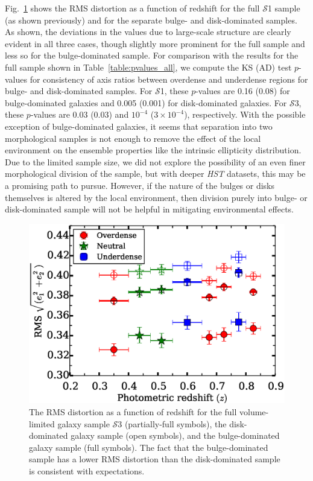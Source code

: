 \documentclass[twocolumn,useAMS,usenatbib]{mn2e}
\newcommand{\s}{\ensuremath{\mathcal{S}}}
\begin{document}
Fig.~\ref{fig:rmsellip_bulge_disk} shows the RMS distortion as
  a function of redshift for the full \s1 sample (as shown previously) and
  for the separate bulge- and disk-dominated samples.  As shown,
  the deviations in the values due to large-scale structure are
  clearly evident in all three cases, though slightly more prominent
  for the full sample and less so for the bulge-dominated sample.  For
comparison with the results for the full sample shown in
Table~\ref{table:pvalues_all}, we compute the KS (AD) test $p$-values
for consistency of axis ratios between overdense and underdense
regions for bulge- and disk-dominated samples.  For \s1, these
$p$-values are 0.16 (0.08) for bulge-dominated galaxies and 0.005
(0.001) for disk-dominated galaxies.  For \s3, these $p$-values are
0.03 (0.03) and $10^{-4}$ ($3\times 10^{-4}$), respectively.  With the
possible exception of bulge-dominated galaxies, it seems that
separation into two morphological samples is not enough to remove the
effect of the local environment on the ensemble properties like the
intrinsic ellipticity distribution.   Due to the limited sample size,
we did not explore the possibility of an even finer morphological
division of the sample, but with deeper {\em HST} datasets, this may
be a promising path to pursue.  However, if the nature of the bulges
or disks themselves is altered by the local environment, then division
purely into bulge- or disk-dominated sample will not be helpful in
mitigating environmental effects.

\begin{figure}
 \centering
 \includegraphics[width=1.0\columnwidth]{rms_ellip_momentbased_S1_bulgedisk} 
 \caption{The RMS distortion as a function of redshift for the
     full volume-limited galaxy sample \s3 (partially-full symbols), the
     disk-dominated galaxy sample (open symbols), and the
     bulge-dominated galaxy sample (full symbols).  The fact that the
     bulge-dominated sample has a lower RMS distortion than the
     disk-dominated sample is consistent with expectations.}
 \label{fig:rmsellip_bulge_disk}
\end{figure}
\end{document}
